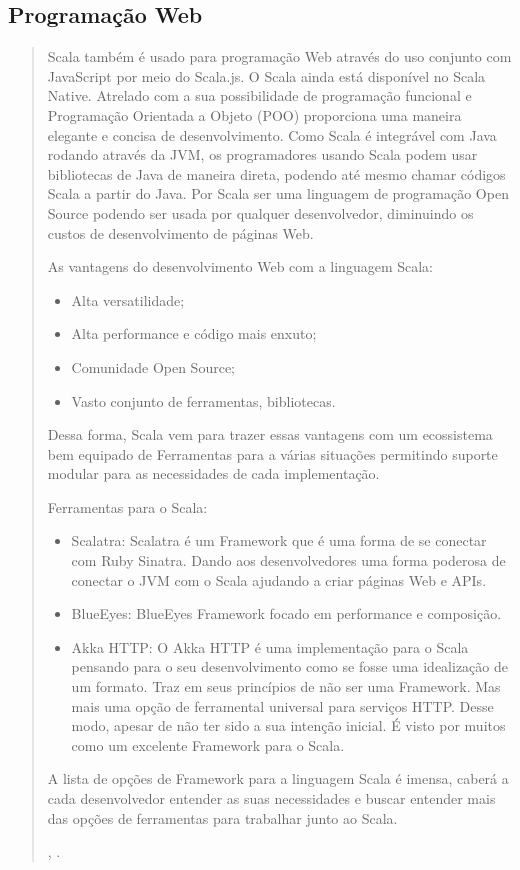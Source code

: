 \subsection{ Programa\c{c}\~{a}o Web}
\begin{quote}
Scala também é usado para programação Web através do uso conjunto com JavaScript por meio do Scala.js. O Scala ainda está disponível no Scala Native. Atrelado com a sua possibilidade  de programação funcional e Programação Orientada a Objeto (POO) proporciona uma maneira elegante e concisa de desenvolvimento. Como Scala é integrável com Java rodando através da JVM, os programadores usando Scala podem usar bibliotecas de Java de maneira direta, podendo até mesmo chamar códigos Scala a partir do Java.
Por Scala ser uma linguagem de programação Open Source podendo ser usada por qualquer desenvolvedor, diminuindo os custos de desenvolvimento de páginas Web.

\hspace{2.5mm} As vantagens do desenvolvimento Web com a linguagem Scala:
   \begin{itemize}
      \item Alta versatilidade;
      \item Alta performance e código mais enxuto;
      \item Comunidade Open Source;
      \item Vasto conjunto de ferramentas, bibliotecas.

   \end{itemize}

Dessa forma, Scala vem para trazer essas vantagens com um ecossistema bem equipado de Ferramentas para  a várias situações permitindo suporte modular para as necessidades de cada implementação.

\hspace{2.5mm} Ferramentas para o Scala:
   \begin{itemize}
   \item Scalatra: Scalatra é um Framework que é uma forma de se conectar com Ruby Sinatra.  Dando aos desenvolvedores uma forma poderosa de conectar o JVM com o Scala ajudando a criar páginas Web e APIs.
   \item BlueEyes: BlueEyes Framework focado em performance e composição.
   \item Akka HTTP: O Akka HTTP é uma implementação para o Scala pensando para o seu desenvolvimento como se fosse uma idealização de um formato. Traz em seus princípios de não ser uma Framework. Mas mais uma opção de ferramental universal para serviços HTTP. Desse modo, apesar de não ter sido a sua intenção inicial. É visto por muitos como um excelente Framework para o Scala.

   \end{itemize}
   A lista de opções de Framework para a linguagem Scala é imensa, caberá a cada desenvolvedor entender as suas necessidades e buscar entender mais das opções de ferramentas para trabalhar junto ao Scala.


   \cite{Whaling}, \cite{web}.
\end{quote}
